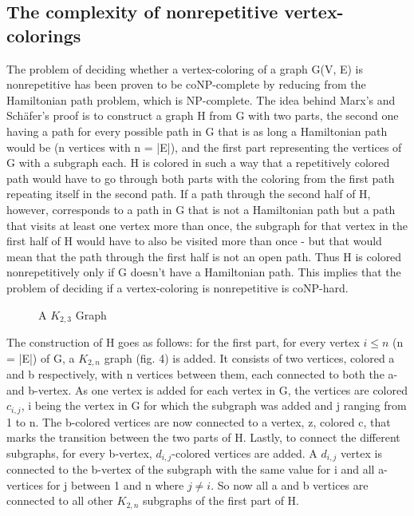 \documentclass[12pt,a4paper]{article}
\begin{document}
\subsection{The complexity of nonrepetitive vertex-colorings}
The problem of deciding whether a vertex-coloring of a graph G(V, E) is nonrepetitive has been proven to be coNP-complete by reducing from the Hamiltonian path problem, which is NP-complete. The idea behind Marx's and Schäfer's proof \citep{Marx2009a} is to construct a graph H from G with two parts, the second one having a path for every possible path in G that is as long a Hamiltonian path would be (n vertices with n = |E|), and the first part representing the vertices of G with a subgraph each. H is colored in such a way that a repetitively colored path would have to go through both parts with the coloring from the first path repeating itself in the second path. If a path through the second half of H, however, corresponds to a path in G that is not a Hamiltonian path but a path that visits at least one vertex more than once, the subgraph for that vertex in the first half of H would have to also be visited more than once - but that would mean that the path through the first half is not an open path. Thus H is colored nonrepetitively only if G doesn't have a Hamiltonian path. This implies that the problem of deciding if a vertex-coloring is nonrepetitive is coNP-hard.
\newline
\begin{wrapfigure}[9]{l}{3cm}
	
	\caption{A $K_{2,3}$ Graph}
\end{wrapfigure}
The construction of H goes as follows: for the first part, for every vertex $i \leq n$ (n = |E|) of G, a $K_{2, n}$ graph (fig. 4) is added. It consists of two vertices, colored a and b respectively, with n vertices between them, each connected to both the a- and b-vertex. As one vertex is added for each vertex in G, the vertices are colored $c_{i,j}$, i being the vertex in G for which the subgraph was added and j ranging from 1 to n. The b-colored vertices are now connected to  a  vertex, z, colored c, that marks the transition between the two parts of H. Lastly, to connect the different subgraphs, for every b-vertex, $d_{i,j}$-colored vertices are added. A $d_{i, j}$ vertex is connected to the b-vertex of the subgraph with the same value for i and all a-vertices for j between 1 and n where $j \neq i$.  So now all a and b vertices are connected to all other $K_{2,n}$ subgraphs of the first part of H.
\newline
\end{document}
